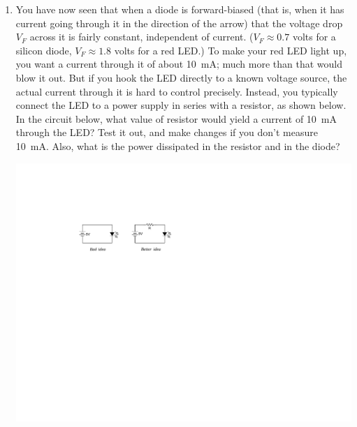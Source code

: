 \begin{enumerate}[wide]
\item You have now seen that when a diode is forward-biased (that is, when it has current going through it in the direction of the arrow) that the voltage drop $V_F$ across it is fairly constant, independent of current.  ($V_F \approx 0.7$ volts for a silicon diode, $V_F \approx 1.8$ volts for a red LED.)  To make your red LED light up, you want a current through it of about 10~mA; much more than that would blow it out.  But if you hook the LED directly to a known voltage source, the actual current through it is hard to control precisely.  Instead, you typically connect the LED to a power supply in series with a resistor, as shown below.  In the circuit below, what value of resistor would yield a current of 10~mA through the LED?  Test it out, and make changes if you don't measure 10~mA.  Also, what is the power dissipated in the resistor and in the diode?
\vspace{-0.1in}
\begin{center}
\includegraphics{diodes/led_with_resistor.pdf}
\end{center}


\end{enumerate}
